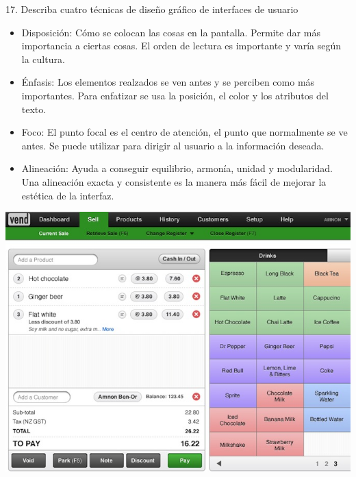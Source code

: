 \documentclass{beamer}
\begin{document}
\begin{frame}
\begin{block}{17. Describa cuatro técnicas de diseño gráfico de interfaces de usuario}
\begin{itemize}
 \item Disposición: Cómo se colocan las cosas en la pantalla. Permite dar más importancia a ciertas cosas. El orden de lectura es importante y varía según la cultura.

\item Énfasis: Los elementos realzados se ven antes y se perciben como más importantes. Para enfatizar se usa la posición, el color y los atributos del texto.

\item Foco: El punto focal es el centro de atención, el punto que normalmente se ve antes. Se puede utilizar para dirigir al usuario a la información deseada. 

\item Alineación: Ayuda a conseguir equilibrio, armonía, unidad y modularidad. Una alineación exacta y consistente es la manera más fácil de mejorar la estética de la interfaz. 
\end{itemize}
\end{block}
\end{frame}
 
\begin{frame}
 \begin{center}
 
\includegraphics[scale = 0.4]{11.jpeg}
\end{center}
\end{frame}
\end{document}
